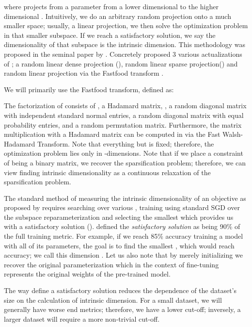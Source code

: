 \documentclass{article} \usepackage{iclr2020_conference,times}
\begin{document}
where  projects from a parameter from a lower dimensional  to the higher dimensional . Intuitively, we do an arbitrary random projection onto a much smaller space; usually, a linear projection, we then solve the optimization problem in that smaller subspace. If we reach a satisfactory solution, we say the dimensionality of that subspace is the intrinsic dimension. This methodology was proposed in the seminal paper by \cite{intrinsic_dimension}. Concretely \cite{intrinsic_dimension} proposed 3 various actualizations of ; a random linear dense projection (), random linear sparse projection() and random linear projection via the Fastfood transform \citep{fastfood}.

We will primarily use the Fastfood transform, defined as:

The factorization of  consists of , a Hadamard matrix, , a random diagonal matrix with independent standard normal entries,  a random diagonal matrix with equal probability  entries, and  a random permutation matrix. Furthermore, the matrix multiplication with a Hadamard matrix can be computed in  via the Fast Walsh-Hadamard Transform. Note that everything but  is fixed; therefore, the optimization problem lies only in -dimensions. Note that if we place a constraint of  being a binary matrix, we recover the sparsification problem; therefore, we can view finding intrinsic dimensionality as a continuous relaxation of the sparsification problem. 

The standard method of measuring the intrinsic dimensionality of an objective as proposed by \cite{intrinsic_dimension} requires searching over various , training using standard SGD over the subspace reparameterization  and selecting the smallest  which provides us with a satisfactory solution (). \cite{intrinsic_dimension} defined the \textit{satisfactory solution} as being 90\% of the full training metric. For example, if we reach 85\% accuracy training a model with all of its parameters, the goal is to find the smallest , which would reach  accuracy; we call this dimension . Let us also note that by merely initializing  we recover the original parameterization  which in the context of fine-tuning represents the original weights of the pre-trained model.

The way \cite{intrinsic_dimension} define a satisfactory solution reduces the dependence of the dataset's size on the calculation of intrinsic dimension. For a small dataset, we will generally have worse end metrics; therefore, we have a lower  cut-off; inversely, a larger dataset will require a more non-trivial  cut-off.
\end{document}
